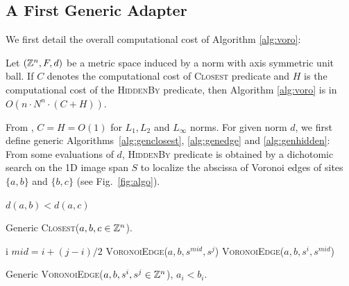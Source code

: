 \documentclass{llncs}
\begin{document}
\subsection{A First Generic Adapter}
\label{sec:first-gener-adapt}
We first detail the overall computational cost of Algorithm
\ref{alg:voro}:
\begin{lemma}
\label{lem:generic}
Let $({\mathbb{Z}}^n, F, d)$ be a metric space induced by a norm with axis
symmetric unit ball. If $C$ denotes the computational cost of
\textsc{Closest} predicate and $H$ is the computational cost of the
\textsc{HiddenBy} predicate, then Algorithm \ref{alg:voro} is in
$O(n\cdot N^n\cdot (C+H))$.
\end{lemma}
From \cite{BreuEtAl95,roerdnik}, $C=H=O(1)$ for $L_1,L_2$ and $L_\infty$
norms.  For given norm $d$, we first define generic
Algorithms~\ref{alg:genclosest}, \ref{alg:genedge} and
\ref{alg:genhidden}: From some evaluations of $d$, \textsc{HiddenBy}
predicate is obtained by a dichotomic search on the 1D image span $S$
to localize the abscissa of Voronoi edges of sites $\{a,b\}$ and
$\{b,c\}$ (see Fig.~\ref{fig:algo}).

\begin{algorithm}[H]\footnotesize
  \Return $d(a,b) < d(a,c)$\;
  \caption{\footnotesize Generic \textsc{Closest}($a,b,c\in{\mathbb{Z}}^n$).\label{alg:genclosest}}
\end{algorithm}

\begin{algorithm}[H]\footnotesize
     {
       \Return  i\;
     }
     $mid  = i + (j-i)/2$\;
       {
         \Return \textsc{VoronoiEdge}($a,b,s^{mid},s^j$)
}
 {
         \Return \textsc{VoronoiEdge}($a,b,s^{i},s^{mid}$)
}

  \caption{\footnotesize Generic \textsc{VoronoiEdge}($a,b,s^i,s^j\in{\mathbb{Z}}^n$), $a_i<b_i$.\label{alg:genedge}}
\end{algorithm}
\end{document}
